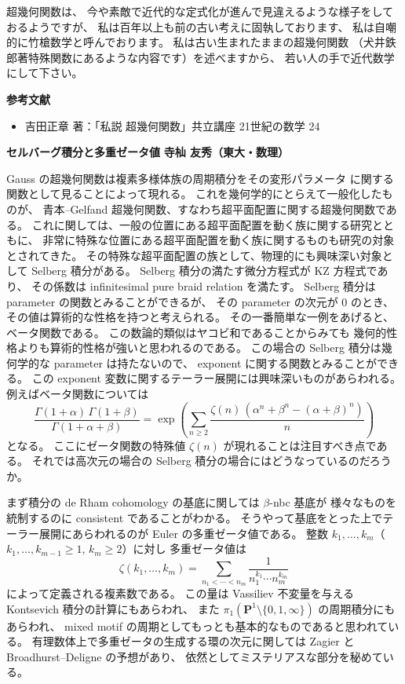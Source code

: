 \documentclass[uplatex,dvipdfmx]{jlreq}
\begin{document}
\medskip

超幾何関数は、
今や素敵で近代的な定式化が進んで見違えるような様子をしておるようですが、
私は百年以上も前の古い考えに固執しております、
私は自嘲的に竹槍数学と呼んでおります。
私は古い生まれたままの超幾何関数
（犬井鉄郎著特殊関数にあるような内容です）を述べますから、
若い人の手で近代数学にして下さい。

\medskip
\noindent
\textbf{参考文献}
\begin{itemize}
  \item[{[1]}] 吉田正章 著：「私説 超幾何関数」\quad 共立講座 21世紀の数学 24
\end{itemize}

\newpage

\noindent
{\large\bfseries セルバーグ積分と多重ゼータ値}
\hfill
{\large\bfseries 寺杣 友秀（東大・数理）}

\medskip

Gauss の超幾何関数は複素多様体族の周期積分をその変形パラメータ
に関する関数として見ることによって現れる。
これを幾何学的にとらえて一般化したものが、
青本--Gelfand 超幾何関数、すなわち超平面配置に関する超幾何関数である。
これに関しては、一般の位置にある超平面配置を動く族に関する研究とともに、
非常に特殊な位置にある超平面配置を動く族に関するものも研究の対象とされてきた。
その特殊な超平面配置の族として、物理的にも興味深い対象として Selberg 積分がある。
Selberg 積分の満たす微分方程式が KZ 方程式であり、
その係数は infinitesimal pure braid relation を満たす。
Selberg 積分は parameter の関数とみることができるが、
その parameter の次元が $0$ のとき、
その値は算術的な性格を持つと考えられる。
その一番簡単な一例をあげると、ベータ関数である。
この数論的類似はヤコビ和であることからみても
幾何的性格よりも算術的性格が強いと思われるのである。
この場合の Selberg 積分は幾何学的な parameter は持たないので、
exponent に関する関数とみることができる。
この exponent 変数に関するテーラー展開には興味深いものがあらわれる。
例えばベータ関数については
\[
  \frac{\Gamma(1+\alpha)\,\Gamma(1+\beta)}{\Gamma(1+\alpha+\beta)}
  = \exp\!\left(\sum_{n \geq 2}
    \frac{\zeta(n)\,(\alpha^n + \beta^n - (\alpha+\beta)^n)}{n}
  \right)
\]
となる。
ここにゼータ関数の特殊値 $\zeta(n)$ が現れることは注目すべき点である。
それでは高次元の場合の Selberg 積分の場合にはどうなっているのだろうか。

まず積分の de Rham cohomology の基底に関しては $\beta$-nbc 基底が
様々なものを統制するのに consistent であることがわかる。
そうやって基底をとった上でテーラー展開にあらわれるのが Euler の多重ゼータ値である。
整数 $k_1, \dots, k_m$（$k_1, \dots, k_{m-1} \geq 1$, $k_m \geq 2$）に対し
多重ゼータ値は
\[
  \zeta(k_1, \dots, k_m)
  = \sum_{n_1 < \cdots < n_m} \frac{1}{n_1^{k_1} \cdots n_m^{k_m}}
\]
によって定義される複素数である。
この量は Vassiliev 不変量を与える Kontsevich 積分の計算にもあらわれ、
また $\pi_1(\mathbf{P}^1 \setminus \{0, 1, \infty\})$ の周期積分にもあらわれ、
mixed motif の周期としてもっとも基本的なものであると思われている。
有理数体上で多重ゼータの生成する環の次元に関しては
Zagier と Broadhurst--Deligne の予想があり、
依然としてミステリアスな部分を秘めている。
\end{document}
